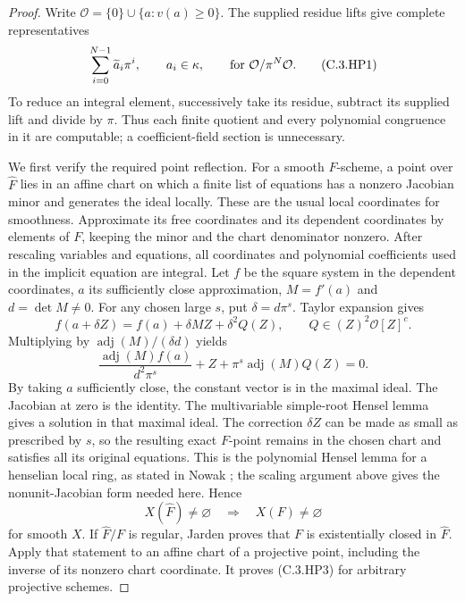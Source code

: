 \begin{proof}
Write $\mathcal O=\{0\}\cup\{a:v(a)\ge0\}$.
The supplied residue lifts give complete representatives
\[
 \sum_{i=0}^{N-1}\widetilde a_i\pi^i,
 \qquad a_i\in\kappa,
 \qquad\hbox{for }\mathcal O/\pi^N\mathcal O.
                                                               \tag{C.3.HP1}
\]
To reduce an integral element, successively take its residue,
subtract its supplied lift and divide by $\pi$.
Thus each finite quotient and every polynomial congruence in it
are computable; a coefficient-field section is unnecessary.

We first verify the required point reflection.
For a smooth $F$-scheme, a point over $\widehat F$ lies in an
affine chart on which a finite list of equations has a nonzero
Jacobian minor and generates the ideal locally.
These are the usual local coordinates for smoothness.
Approximate its free coordinates and its dependent coordinates
by elements of $F$, keeping the minor and the chart denominator
nonzero. After rescaling variables and equations, all coordinates
and polynomial coefficients used in the implicit equation are integral.
Let $f$ be the square system in the dependent coordinates,
$a$ its sufficiently close approximation, $M=f'(a)$ and
$d=\det M\ne0$. For any chosen large $s$, put $\delta=d\pi^s$.
Taylor expansion gives
\[
 f(a+\delta Z)=f(a)+\delta MZ+\delta^2Q(Z),
 \qquad Q\in (Z)^2\mathcal O[Z]^c.
\]
Multiplying by $\operatorname{adj}(M)/(\delta d)$ yields
\[
 \frac{\operatorname{adj}(M)f(a)}{d^2\pi^s}
       +Z+\pi^s\operatorname{adj}(M)Q(Z)=0.             \tag{C.3.HP2}
\]
By taking $a$ sufficiently close, the constant vector is in the
maximal ideal. The Jacobian at zero is the identity.
The multivariable simple-root Hensel lemma gives a solution in
that maximal ideal. The correction $\delta Z$ can be made as
small as prescribed by $s$, so the resulting exact $F$-point
remains in the chosen chart and satisfies all its original equations.
This is the polynomial Hensel lemma for a henselian local ring,
as stated in Nowak \cite[Remark 2 and Corollary 3, p.\ 2]
{C-NowakDensity2017}; the scaling argument above gives the
nonunit-Jacobian form needed here. Hence
\[
 X(\widehat F)\ne\varnothing\quad\Longrightarrow\quad
 X(F)\ne\varnothing
                                                               \tag{C.3.HP3}
\]
for smooth $X$. If $\widehat F/F$ is regular, Jarden
\cite[Lemma 2.3 and its proof, pp.\ 6--7 of the author version]
{C-JardenHenselian1994} proves that $F$ is existentially closed in
$\widehat F$. Apply that statement to an affine chart of a
projective point, including the inverse of its nonzero chart
coordinate. It proves (C.3.HP3) for arbitrary projective schemes.


\end{proof}
